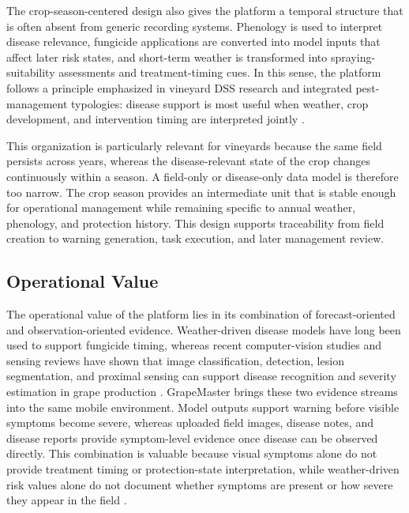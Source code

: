 \documentclass[11pt,a4paper]{article}
\begin{document}
The crop-season-centered design also gives the platform a temporal structure that is often absent from generic recording systems. Phenology is used to interpret disease relevance, fungicide applications are converted into model inputs that affect later risk states, and short-term weather is transformed into spraying-suitability assessments and treatment-timing cues. In this sense, the platform follows a principle emphasized in vineyard DSS research and integrated pest-management typologies: disease support is most useful when weather, crop development, and intervention timing are interpreted jointly \citep{Rossi2014ViteNet,Marinko2024IPMTypology,Helps2024DSSValue}.

This organization is particularly relevant for vineyards because the same field persists across years, whereas the disease-relevant state of the crop changes continuously within a season. A field-only or disease-only data model is therefore too narrow. The crop season provides an intermediate unit that is stable enough for operational management while remaining specific to annual weather, phenology, and protection history. This design supports traceability from field creation to warning generation, task execution, and later management review.

\subsection{Operational Value}

The operational value of the platform lies in its combination of forecast-oriented and observation-oriented evidence. Weather-driven disease models have long been used to support fungicide timing, whereas recent computer-vision studies and sensing reviews have shown that image classification, detection, lesion segmentation, and proximal sensing can support disease recognition and severity estimation in grape production \citep{Orlandini1993PLASMO,Kunduracioglu2024GrapeDeepLearning,Portela2024GrapevineSensingReview}. GrapeMaster brings these two evidence streams into the same mobile environment. Model outputs support warning before visible symptoms become severe, whereas uploaded field images, disease notes, and disease reports provide symptom-level evidence once disease can be observed directly. This combination is valuable because visual symptoms alone do not provide treatment timing or protection-state interpretation, while weather-driven risk values alone do not document whether symptoms are present or how severe they appear in the field \citep{Shi2023SeverityAssessment,Puelles2024DownyMildewModels}.
\end{document}
